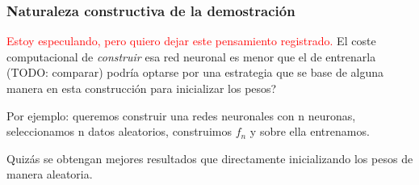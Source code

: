 \subsubsection*{Naturaleza constructiva de la demostración}
\textcolor{red}{Estoy especulando, pero quiero dejar este pensamiento registrado.}
El coste computacional de \textit{construir} esa red neuronal 
es menor que el de entrenarla (TODO: comparar)
podría optarse por una estrategia que se base de alguna manera 
en esta construcción para inicializar los pesos?

Por ejemplo: queremos construir una redes neuronales con n neuronas, 
seleccionamos n datos aleatorios, construimos $f_n$ 
y sobre ella entrenamos. 

Quizás se obtengan mejores resultados que directamente inicializando los pesos de manera aleatoria. 
